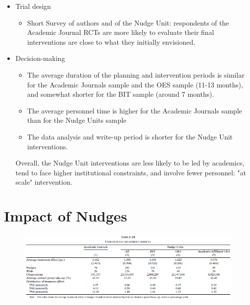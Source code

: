 \documentclass[dvipdfmx,11pt]{beamer}
\begin{document}
\begin{frame}{}
  \begin{itemize}
    \item Trial design
    \begin{itemize}
      \item Short Survey of authors and of the Nudge Unit: respondents of the Academic Journal RCTs are more likely to evaluate their final interventions are close to what they initially envisioned.
    \end{itemize}
    \item Decision-making
    \begin{itemize}
      \item The average duration of the planning and intervention periods is similar for the Academic Journals sample and the OES sample (11-13 months), and somewhat shorter for the BIT sample (around 7 months).
      \item The average personnel time is higher for the Academic Journals sample than for the Nudge Units sample
      \item The data analysis and write-up period is shorter for the Nudge Unit interventions.
    \end{itemize}
    Overall, the Nudge Unit interventions are less likely to be led by academics, tend to face higher institutional constraints, and involve fewer personnel: "at scale" intervention.
  \end{itemize}
\end{frame}

\section{Impact of Nudges}
\frame{\sectionpage}

\begin{frame}{}
  \begin{figure}
    \centering
    \includegraphics[scale = .6]{fig_tab/os20220412/T3}
  \end{figure}
\end{frame}
\end{document}
